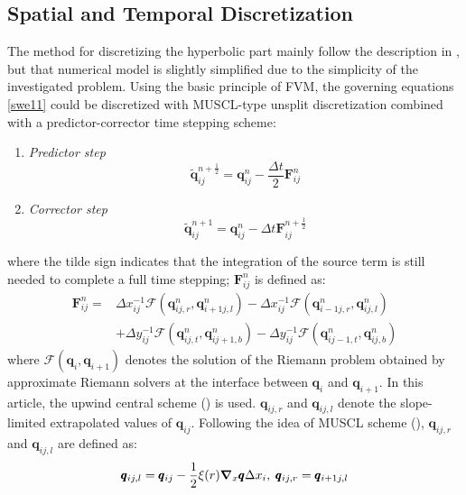 \documentclass{jfm}
\begin{document}
\subsection{Spatial and Temporal Discretization}
The method for discretizing the hyperbolic part mainly follow the description in \cite{Popinet2011}, but that numerical model is slightly simplified due to the simplicity of the investigated problem. Using the basic principle of FVM, the governing equations  \autoref{swe11} could be discretized with MUSCL-type unsplit discretization combined with a predictor-corrector time stepping scheme:
\begin{enumerate}
\item \textit{Predictor step}
\begin{equation}
\tilde{\pmb{q}}_{ij}^{n+\frac{1}{2}} = \pmb{q}_{ij}^{n} - \frac{\Delta t}{2} \pmb{{F}}^n_{ij}
\label{hyper_part_ps}
\end{equation}
\item \textit{Corrector step}
\begin{equation}
\tilde{\pmb{q}}_{ij}^{n+1} = \pmb{q}_{ij}^{n} - \Delta t \pmb{{F}}^{n+\frac{1}{2}}_{ij}
\label{hyper_part_cs}
\end{equation}
\end{enumerate}
where the tilde sign indicates that the integration of the source term is still needed to complete a full time stepping; $\pmb{{F}}^{n }_{ij}$ is defined as:
\begin{equation}
\begin{split}
\pmb{{F}}^{n }_{ij} = &\Delta x_{ij}^{-1}\pmb{\mathcal{F}}(\pmb{q}_{ij,r}^{n}, \pmb{q}_{i+1j,l}^{n}) - \Delta x_{ij}^{-1}\pmb{\mathcal{F}}(\pmb{q}_{i-1j,r}^{n}, \pmb{q}_{ij,l}^{n}) \\
						& +\Delta y_{ij}^{-1}\pmb{\mathcal{F}}(\pmb{q}_{ij,t}^{n}, \pmb{q}_{ij+1,b}^{n})-\Delta y_{ij}^{-1}\pmb{\mathcal{F}}(\pmb{q}_{ij-1,t}^{n}, \pmb{q}_{ij,b}^{n})
\end{split}
\end{equation}
where $\pmb{\mathcal{F}}(\pmb{q}_i, \pmb{q}_{i+1})$ denotes the solution of the Riemann problem obtained by approximate Riemann solvers at the interface between $\pmb{q}_i$ and $\pmb{q}_{i+1}$. In this article, the  upwind central scheme (\cite{Kurganov2002}) is used. $\pmb{q}_{ij,r}$ and $\pmb{q}_{ij,l}$ denote the slope-limited extrapolated values of $\pmb{q}_{ij}$. Following the idea of MUSCL scheme (\cite{Toro2001}), $\pmb{q}_{ij,r}$ and $\pmb{q}_{ij,l}$ are defined as:
\begin{equation}
\pmb{q}_{ij,l}=\pmb{q}_{ij}-\frac{1}{2}\xi(r){\grad}_x \pmb{q}\Delta x_i,\;
\pmb{q}_{ij,r}=\pmb{q}_{i+1j,l}
\end{equation}
\end{document}
